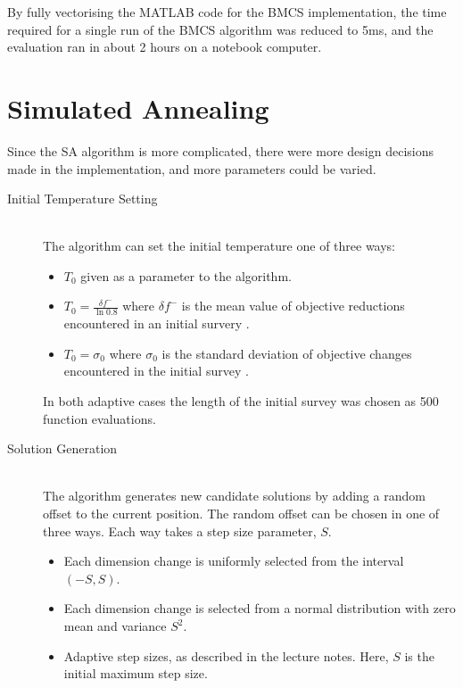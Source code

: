 \documentclass[10pt]{article}
\begin{document}
By fully vectorising the MATLAB code for the BMCS implementation, the time
required for a single run of the BMCS algorithm was reduced to 5ms, and the
evaluation ran in about 2 hours on a notebook computer.

\section{Simulated Annealing}

Since the SA algorithm is more complicated, there were more design decisions
made in the implementation, and more parameters could be varied.

\begin{description}
  \item[Initial Temperature Setting] \hfill \\
    The algorithm can set the initial temperature one of three ways:
    \begin{itemize}
      \item $T_0$ given as a parameter to the algorithm.
      \item $\displaystyle T_0 = \frac{\delta f^-}{\ln 0.8}$ where $\delta f^-$ is
        the mean value of objective reductions encountered in an initial
        survery \cite{kirk}.
      \item $T_0 = \sigma_0$ where $\sigma_0$ is the standard deviation of
        objective changes encountered in the initial survey \cite{white:261}.
    \end{itemize}
    In both adaptive cases the length of the initial survey was chosen as 500
    function evaluations.

  \item[Solution Generation] \hfill \\
    The algorithm generates new candidate solutions by adding a random offset
    to the current position. The random offset can be chosen in one of three
    ways. Each way takes a step size parameter, $S$.
    \begin{itemize}
      \item Each dimension change is uniformly selected from the interval
        $(-S, S)$.
      \item Each dimension change is selected from a normal distribution with
        zero mean and variance $S^2$.
      \item Adaptive step sizes\cite{parks}, as
        described in the lecture notes. Here, $S$ is the initial maximum step
        size.
    \end{itemize}


\end{description}
\end{document}
